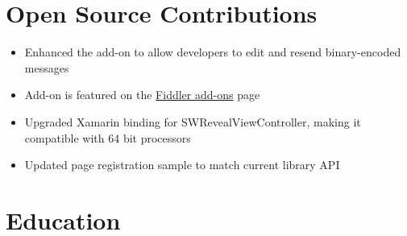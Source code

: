 \documentclass[12pt,letterpaper,sans]{moderncv}
\begin{document}
\section{Open Source Contributions}
	\begin{itemize}[leftmargin=1.24in]
		\item Enhanced the add-on to allow developers to edit and resend binary-encoded messages
		\item Add-on is featured on the \href{www.telerik.com/fiddler/add-ons}{Fiddler add-ons} page
	\end{itemize}
	\begin{itemize}[leftmargin=1.24in]
		\item Upgraded Xamarin binding for SWRevealViewController, making it compatible with 64 bit processors
	\end{itemize}
	\begin{itemize}[leftmargin=1.24in]
		\item Updated page registration sample to match current library API
	\end{itemize}


\section{Education}
\end{document}
